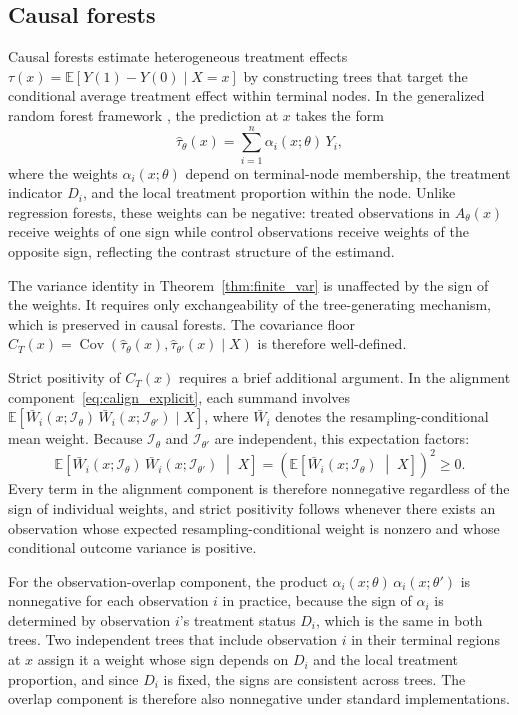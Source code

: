\documentclass[11pt]{article}
\theoremstyle{plain}
\theoremstyle{definition}
\theoremstyle{remark}
\DeclareMathOperator{\Cov}{Cov}
\begin{document}
\subsection{Causal forests}
\label{subsec:causal}

Causal forests \citep{athey2019, wager2018} estimate heterogeneous treatment effects $\tau(x) = \mathbb E[Y(1) - Y(0) \mid X = x]$ by constructing trees that target the conditional average treatment effect within terminal nodes. In the generalized random forest framework \citep{athey2019}, the prediction at $x$ takes the form
\[
\hat\tau_\theta(x) = \sum_{i=1}^n \alpha_i(x;\theta)\,Y_i,
\]
where the weights $\alpha_i(x;\theta)$ depend on terminal-node membership, the treatment indicator $D_i$, and the local treatment proportion within the node. Unlike regression forests, these weights can be negative: treated observations in $A_\theta(x)$ receive weights of one sign while control observations receive weights of the opposite sign, reflecting the contrast structure of the estimand.

The variance identity in Theorem~\ref{thm:finite_var} is unaffected by the sign of the weights. It requires only exchangeability of the tree-generating mechanism, which is preserved in causal forests. The covariance floor $C_T(x) = \Cov(\hat\tau_\theta(x), \hat\tau_{\theta'}(x) \mid X)$ is therefore well-defined.

Strict positivity of $C_T(x)$ requires a brief additional argument. In the alignment component~\eqref{eq:calign_explicit}, each summand involves $\mathbb E[\bar W_i(x;\mathcal I_\theta)\,\bar W_i(x;\mathcal I_{\theta'}) \mid X]$, where $\bar W_i$ denotes the resampling-conditional mean weight. Because $\mathcal I_\theta$ and $\mathcal I_{\theta'}$ are independent, this expectation factors:
\[
\mathbb E\!\left[\bar W_i(x;\mathcal I_\theta)\,\bar W_i(x;\mathcal I_{\theta'}) \;\middle|\; X\right]
=
\left(\mathbb E\!\left[\bar W_i(x;\mathcal I_\theta) \;\middle|\; X\right]\right)^2
\ge 0.
\]
Every term in the alignment component is therefore nonneg\-ative regardless of the sign of individual weights, and strict positivity follows whenever there exists an observation whose expected resampling-conditional weight is nonzero and whose conditional outcome variance is positive.

For the observation-overlap component, the product $\alpha_i(x;\theta)\,\alpha_i(x;\theta')$ is nonneg\-ative for each observation $i$ in practice, because the sign of $\alpha_i$ is determined by observation $i$'s treatment status $D_i$, which is the same in both trees. Two independent trees that include observation $i$ in their terminal regions at $x$ assign it a weight whose sign depends on $D_i$ and the local treatment proportion, and since $D_i$ is fixed, the signs are consistent across trees. The overlap component is therefore also nonneg\-ative under standard implementations.
\end{document}
